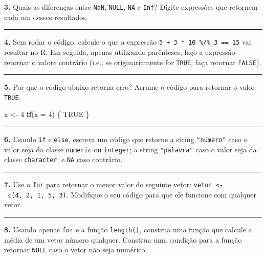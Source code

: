 \documentclass[]{book}
\newenvironment{Shaded}{\begin{snugshade}}{\end{snugshade}}
\newcommand{\ControlFlowTok}[1]{\textcolor[rgb]{0.13,0.29,0.53}{\textbf{#1}}}
\newcommand{\DataTypeTok}[1]{\textcolor[rgb]{0.13,0.29,0.53}{#1}}
\newcommand{\DecValTok}[1]{\textcolor[rgb]{0.00,0.00,0.81}{#1}}
\newcommand{\NormalTok}[1]{#1}
\newcommand{\OtherTok}[1]{\textcolor[rgb]{0.56,0.35,0.01}{#1}}
\newcommand{\StringTok}[1]{\textcolor[rgb]{0.31,0.60,0.02}{#1}}
\begin{document}
\textbf{3.} Quais as diferenças entre \texttt{NaN}, \texttt{NULL}, \texttt{NA} e \texttt{Inf}? Digite expressões que retornem cada um desses resultados.

\begin{center}\rule{0.5\linewidth}{0.5pt}\end{center}

\textbf{4.} Sem rodar o código, calcule o que a expressão \texttt{5\ +\ 3\ *\ 10\ \%/\%\ 3\ ==\ 15} vai resultar no R. Em seguida, apenas utilizando parênteses, faço a expressão retornar o valore contrário (i.e., se originariamente for \texttt{TRUE}, faça retornar \texttt{FALSE}).

\begin{center}\rule{0.5\linewidth}{0.5pt}\end{center}

\textbf{5.} Por que o código abaixo retorna erro? Arrume o código para retornar o valor \texttt{TRUE}.

\begin{Shaded}
\begin{Highlighting}[]
\NormalTok{x <-}\StringTok{ }\DecValTok{4}
\ControlFlowTok{if}\NormalTok{(}\DataTypeTok{x =} \DecValTok{4}\NormalTok{) \{}
  \OtherTok{TRUE}
\NormalTok{\}}
\end{Highlighting}
\end{Shaded}

\begin{center}\rule{0.5\linewidth}{0.5pt}\end{center}

\textbf{6.} Usando \texttt{if} e \texttt{else}, escreva um código que retorne a string \texttt{"número"} caso o valor seja da classe \texttt{numeric} ou \texttt{integer}; a string \texttt{"palavra"} caso o valor seja da classe \texttt{character}; e \texttt{NA} caso contrário.

\begin{center}\rule{0.5\linewidth}{0.5pt}\end{center}

\textbf{7.} Use o \texttt{for} para retornar o menor valor do seguinte vetor: \texttt{vetor\ \textless{}-\ c(4,\ 2,\ 1,\ 5,\ 3)}. Modifique o seu código para que ele funcione com qualquer vetor.

\begin{center}\rule{0.5\linewidth}{0.5pt}\end{center}

\textbf{8.} Usando apenas \texttt{for} e a função \texttt{length()}, construa uma função que calcule a média de um vetor número qualquer. Construa uma condição para a função retornar \texttt{NULL} caso o vetor não seja numérico.
\end{document}

